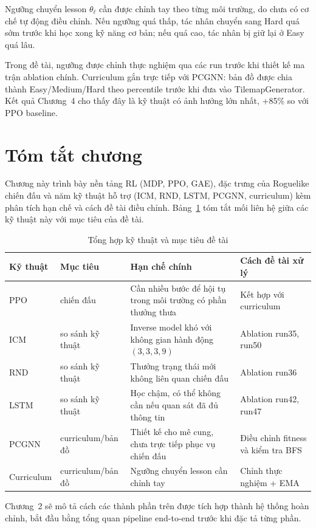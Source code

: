 Ngưỡng chuyển lesson $\theta_\ell$ cần được chỉnh tay theo từng môi trường, do chưa có cơ chế tự động điều chỉnh. Nếu ngưỡng quá thấp, tác nhân chuyển sang Hard quá sớm trước khi học xong kỹ năng cơ bản; nếu quá cao, tác nhân bị giữ lại ở Easy quá lâu.

Trong đề tài, ngưỡng được chỉnh thực nghiệm qua các run trước khi thiết kế ma trận ablation chính. Curriculum gắn trực tiếp với PCGNN: bản đồ được chia thành Easy/Medium/Hard theo percentile trước khi đưa vào TilemapGenerator. Kết quả Chương~4 cho thấy đây là kỹ thuật có ảnh hưởng lớn nhất, +85\% so với PPO baseline.

\section{Tóm tắt chương}

Chương này trình bày nền tảng RL (MDP, PPO, GAE), đặc trưng của Roguelike chiến đấu và năm kỹ thuật hỗ trợ (ICM, RND, LSTM, PCGNN, curriculum) kèm phân tích hạn chế và cách đề tài điều chỉnh. Bảng~\ref{tab:technique_summary} tóm tắt mối liên hệ giữa các kỹ thuật này với mục tiêu của đề tài.

\begin{table}[H]
    \centering
    \small
    \caption{Tổng hợp kỹ thuật và mục tiêu đề tài}
    \label{tab:technique_summary}
    \begin{tabular}{|p{2.0cm}|p{2.2cm}|p{4.5cm}|p{4.0cm}|}
        \hline
        \textbf{Kỹ thuật} & \textbf{Mục tiêu} & \textbf{Hạn chế chính} & \textbf{Cách đề tài xử lý} \\
        \hline
        PPO & chiến đấu & Cần nhiều bước để hội tụ trong môi trường có phần thưởng thưa & Kết hợp với curriculum \\
        \hline
        ICM & so sánh kỹ thuật & Inverse model khó với không gian hành động $(3,3,3,9)$ & Ablation run35, run50 \\
        \hline
        RND & so sánh kỹ thuật & Thưởng trạng thái mới không liên quan chiến đấu & Ablation run36 \\
        \hline
        LSTM & so sánh kỹ thuật & Học chậm, có thể không cần nếu quan sát đã đủ thông tin & Ablation run42, run47 \\
        \hline
        PCGNN & curriculum/bản đồ & Thiết kế cho mê cung, chưa trực tiếp phục vụ chiến đấu & Điều chỉnh fitness và kiểm tra BFS \\
        \hline
        Curriculum & curriculum/bản đồ & Ngưỡng chuyển lesson cần chỉnh tay & Chỉnh thực nghiệm + EMA \\
        \hline
    \end{tabular}
\end{table}

Chương~2 sẽ mô tả cách các thành phần trên được tích hợp thành hệ thống hoàn chỉnh, bắt đầu bằng tổng quan pipeline end-to-end trước khi đặc tả từng phần.
